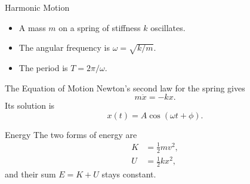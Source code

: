 \documentclass{beamer}
\begin{document}
\begin{frame}{Harmonic Motion}
  \begin{itemize}
    \item A mass $m$ on a spring of stiffness $k$ oscillates.
    \item The angular frequency is $\omega = \sqrt{k/m}$.
    \item The period is $T = 2\pi/\omega$.
  \end{itemize}
\end{frame}

\begin{frame}{The Equation of Motion}
  Newton's second law for the spring gives
  \begin{equation*}
    m \ddot{x} = -k x .
  \end{equation*}
  Its solution is
  \begin{equation*}
    x(t) = A \cos(\omega t + \phi).
  \end{equation*}
\end{frame}

\begin{frame}{Energy}
  The two forms of energy are
  \begin{align*}
    K &= \tfrac{1}{2} m v^2, \\
    U &= \tfrac{1}{2} k x^2,
  \end{align*}
  and their sum $E = K + U$ stays constant.
\end{frame}
\end{document}
